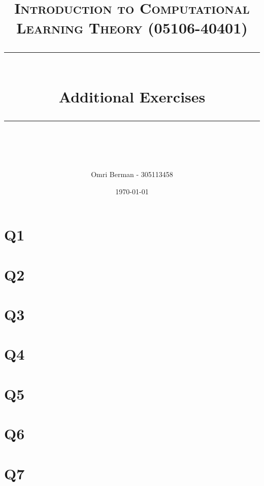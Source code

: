 \documentclass{article} %
\title{
\normalfont \normalsize 
\textsc{Introduction to Computational Learning Theory (05106-40401)} \\
[10pt] 
\rule{\linewidth}{0.5pt} \\[6pt] 
\huge Additional Exercises \\
\rule{\linewidth}{2pt}  \\[10pt]
}
\author{Omri Berman - 305113458}
\date{\normalsize \today}
\begin{document}
\maketitle
\noindent

\section*{Q1}


\section*{Q2}


\section*{Q3}


\section*{Q4}


\section*{Q5}


\section*{Q6}


\section*{Q7}

\end{document}
